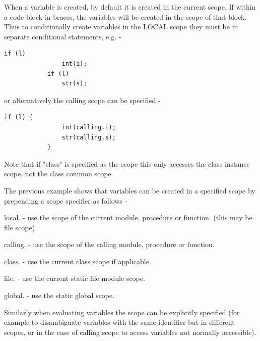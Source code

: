         When a variable is created, by default it is created in the current
        scope. If within a code block in braces, the variables will be created
        in the scope of that block. Thus to conditionally create variables
        in the LOCAL scope they must be in separate conditional statements, e.g. -
        \begin{lstlisting}[gobble=8, language=threepl]
            if (l)
                int(i);
            if (l)
                str(s);
        \end{lstlisting}
        or alternatively the calling scope can be specified -
        \begin{lstlisting}[gobble=8, language=threepl]
            if (l) {
                int(calling.i);
                str(calling.s);
            }
        \end{lstlisting}
        Note that if "class" is specified as the scope this only accesses the
        class instance scope, not the class common scope.

        The previous example shows that variables can be created in a
        specified scope by prepending a scope specifier as follows -
        \blist
        \item   local. - use the scope of the current module, procedure or
                function. (this may be file scope)
        \item   calling. - use the scope of the calling module, procedure or
                function.
        \item   class. - use the current class scope if applicable.
        \item   file. - use the current static file module scope.
        \item   global. - use the static global scope.
        \blend

        Similarly when evaluating variables the scope can be explicitly
        specified (for example to disambiguate variables with the same
        identifier but in different scopes, or in the case of calling scope to
        access variables not normally accessible).


